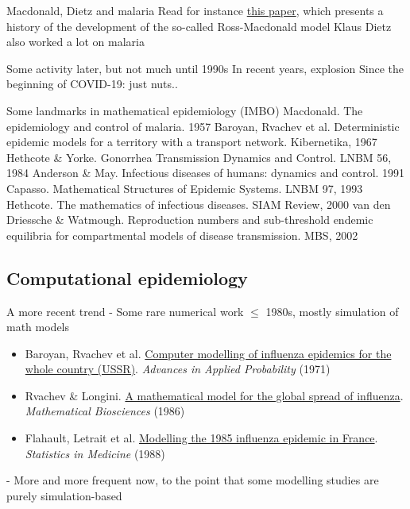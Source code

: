 \documentclass[aspectratio=169]{beamer}\usepackage[]{graphicx}\usepackage[]{xcolor}
\begin{document}
\begin{frame}{Macdonald, Dietz and malaria}
\bbullet Read for instance \href{https://doi.org/10.1371/journal.ppat.1002588}{this paper}, which presents a history of the development of the so-called Ross-Macdonald model
\vfill
\bbullet Klaus Dietz also worked a lot on malaria
\end{frame}
    
    
\begin{frame}{Some activity later, but not much until 1990s}
\bbullet In recent years, explosion
\vfill
\bbullet Since the beginning of COVID-19: just nuts..
\end{frame}

\begin{frame}{Some landmarks in mathematical epidemiology (IMBO)}
\bbullet Macdonald. The epidemiology and control of malaria. 1957
\vfill
\bbullet Baroyan, Rvachev et al. Deterministic epidemic models for a territory with a transport network. Kibernetika, 1967
\vfill
\bbullet Hethcote \& Yorke. Gonorrhea Transmission Dynamics and Control. LNBM 56, 1984
\vfill
\bbullet Anderson \& May. Infectious diseases of humans: dynamics and control. 1991
\vfill
\bbullet Capasso. Mathematical Structures of Epidemic Systems. LNBM 97, 1993
\vfill
\bbullet Hethcote. The mathematics of infectious diseases. SIAM Review, 2000
\vfill
\bbullet van den Driessche \& Watmough. Reproduction numbers and sub-threshold endemic equilibria for compartmental models of disease transmission. MBS, 2002      
\end{frame}


\subsection{Computational epidemiology}

\begin{frame}{A more recent trend}
- Some rare numerical work $\leq$ 1980s, mostly simulation of math models
\begin{itemize}
    \item Baroyan, Rvachev et al. \href{https://doi.org/10.2307/1426167}{Computer modelling of influenza epidemics for the whole country (USSR)}. \emph{Advances in Applied Probability} (1971) 
    \item Rvachev \& Longini. \href{https://doi.org/10.1016/0025-5564(85)90064-1}{A mathematical model for the global spread of influenza}. \emph{Mathematical Biosciences} (1986) 
    \item Flahault, Letrait et al. \href{https://doi.org/10.1002/sim.4780071107}{Modelling the 1985 influenza epidemic in France}. \emph{Statistics in Medicine} (1988)
\end{itemize}
\vfill
- More and more frequent now, to the point that some modelling studies are purely simulation-based
\end{frame}
\end{document}
